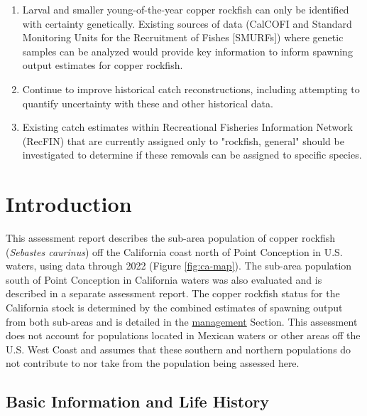 \documentclass[11pt,
  letterpaper,
]{article}
\begin{document}
\begin{enumerate}
    \item Larval and smaller young-of-the-year copper rockfish can only be identified with certainty genetically. Existing sources of data (CalCOFI and Standard Monitoring Units for the Recruitment of Fishes [SMURFs]) where genetic samples can be analyzed would provide key information to inform spawning output estimates for copper rockfish.
 
    \item Continue to improve historical catch reconstructions, including attempting to quantify uncertainty with these and other historical data.
  
    \item Existing catch estimates within Recreational Fisheries Information Network (RecFIN) that are currently assigned only to "rockfish, general" should be investigated to determine if these removals can be assigned to specific species.

\end{enumerate}

\section{Introduction}\label{introduction}

This assessment report describes the sub-area population of copper rockfish (\emph{Sebastes caurinus}) off the California coast north of Point Conception in U.S. waters, using data through 2022 (Figure \ref{fig:ca-map}). The sub-area population south of Point Conception in California waters was also evaluated and is described in a separate assessment report. The copper rockfish status for the California stock is determined by the combined estimates of spawning output from both sub-areas and is detailed in the \hyperref[management]{management} Section. This assessment does not account for populations located in Mexican waters or other areas off the U.S. West Coast and assumes that these southern and northern populations do not contribute to nor take from the population being assessed here.

\subsection{Basic Information and Life History}\label{basic-information-and-life-history}
\end{document}
